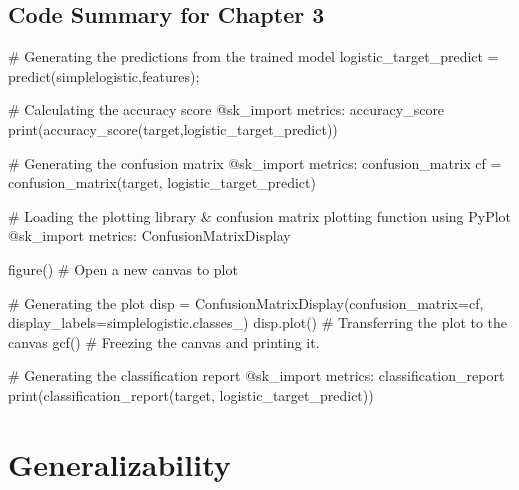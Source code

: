 \documentclass[
  letterpaper,
]{book}
\newenvironment{Shaded}{\begin{snugshade}}{\end{snugshade}}
\newcommand{\BuiltInTok}[1]{\textcolor[rgb]{0.00,0.23,0.31}{#1}}
\newcommand{\CommentTok}[1]{\textcolor[rgb]{0.37,0.37,0.37}{#1}}
\newcommand{\FunctionTok}[1]{\textcolor[rgb]{0.28,0.35,0.67}{#1}}
\newcommand{\ImportTok}[1]{\textcolor[rgb]{0.00,0.46,0.62}{#1}}
\newcommand{\NormalTok}[1]{\textcolor[rgb]{0.00,0.23,0.31}{#1}}
\newcommand{\OperatorTok}[1]{\textcolor[rgb]{0.37,0.37,0.37}{#1}}
\newcommand{\PreprocessorTok}[1]{\textcolor[rgb]{0.68,0.00,0.00}{#1}}
\begin{document}
\hypertarget{code-summary-for-chapter-3}{%
\section*{Code Summary for Chapter 3}\label{code-summary-for-chapter-3}}

\begin{Shaded}
\begin{Highlighting}[]
\CommentTok{\# Generating the predictions from the trained model}
\NormalTok{logistic\_target\_predict }\OperatorTok{=} \FunctionTok{predict}\NormalTok{(simplelogistic,features);}

\CommentTok{\# Calculating the accuracy score }
\PreprocessorTok{@sk\_import}\NormalTok{ metrics}\OperatorTok{:}\NormalTok{ accuracy\_score}
\FunctionTok{print}\NormalTok{(}\FunctionTok{accuracy\_score}\NormalTok{(target,logistic\_target\_predict))}

\CommentTok{\# Generating the confusion matrix }
\PreprocessorTok{@sk\_import}\NormalTok{ metrics}\OperatorTok{:}\NormalTok{ confusion\_matrix}
\NormalTok{cf }\OperatorTok{=} \FunctionTok{confusion\_matrix}\NormalTok{(target, logistic\_target\_predict)}

\CommentTok{\# Loading the plotting library \& confusion matrix plotting function}
\ImportTok{using} \BuiltInTok{PyPlot}
\PreprocessorTok{@sk\_import}\NormalTok{ metrics}\OperatorTok{:}\NormalTok{ ConfusionMatrixDisplay}

\FunctionTok{figure}\NormalTok{() }\CommentTok{\# Open a new canvas to plot}

\CommentTok{\# Generating the plot }
\NormalTok{disp }\OperatorTok{=} \FunctionTok{ConfusionMatrixDisplay}\NormalTok{(confusion\_matrix}\OperatorTok{=}\NormalTok{cf,}
\NormalTok{            display\_labels}\OperatorTok{=}\NormalTok{simplelogistic.classes\_)}
\NormalTok{disp.}\FunctionTok{plot}\NormalTok{() }\CommentTok{\# Transferring the plot to the canvas}
\FunctionTok{gcf}\NormalTok{() }\CommentTok{\# Freezing the canvas and printing it.}

\CommentTok{\# Generating the classification report}
\PreprocessorTok{@sk\_import}\NormalTok{ metrics}\OperatorTok{:}\NormalTok{ classification\_report}
\FunctionTok{print}\NormalTok{(}\FunctionTok{classification\_report}\NormalTok{(target, logistic\_target\_predict))}
\end{Highlighting}
\end{Shaded}

\hypertarget{generalizability}{%
\chapter{Generalizability}\label{generalizability}}
\end{document}
